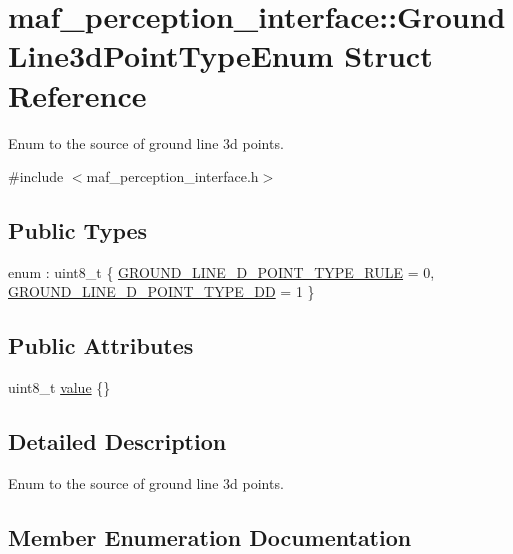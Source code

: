 \hypertarget{structmaf__perception__interface_1_1GroundLine3dPointTypeEnum}{}\section{maf\+\_\+perception\+\_\+interface\+:\+:Ground\+Line3d\+Point\+Type\+Enum Struct Reference}
\label{structmaf__perception__interface_1_1GroundLine3dPointTypeEnum}


Enum to the source of ground line 3d points.  




{\ttfamily \#include $<$maf\+\_\+perception\+\_\+interface.\+h$>$}

\subsection*{Public Types}
\begin{DoxyCompactItemize}
\item 
enum \+: uint8\+\_\+t \{ \hyperlink{structmaf__perception__interface_1_1GroundLine3dPointTypeEnum_a01941263c9c76f33b16972fc7cacb72dab6559711a5180bee2744263ce91bbe26}{G\+R\+O\+U\+N\+D\+\_\+\+L\+I\+N\+E\+\_\+D\+\_\+\+P\+O\+I\+N\+T\+\_\+\+T\+Y\+P\+E\+\_\+\+R\+U\+LE} = 0, 
\hyperlink{structmaf__perception__interface_1_1GroundLine3dPointTypeEnum_a01941263c9c76f33b16972fc7cacb72dad06e66727e5e0350e034adec808c1d35}{G\+R\+O\+U\+N\+D\+\_\+\+L\+I\+N\+E\+\_\+D\+\_\+\+P\+O\+I\+N\+T\+\_\+\+T\+Y\+P\+E\+\_\+\+DD} = 1
 \}
\end{DoxyCompactItemize}
\subsection*{Public Attributes}
\begin{DoxyCompactItemize}
\item 
uint8\+\_\+t \hyperlink{structmaf__perception__interface_1_1GroundLine3dPointTypeEnum_a0baf1f63421fc8572e8a63db628b10f9}{value} \{\}
\end{DoxyCompactItemize}


\subsection{Detailed Description}
Enum to the source of ground line 3d points. 

\subsection{Member Enumeration Documentation}
\mbox{\label{structmaf__perception__interface_1_1GroundLine3dPointTypeEnum_a01941263c9c76f33b16972fc7cacb72d}} 
